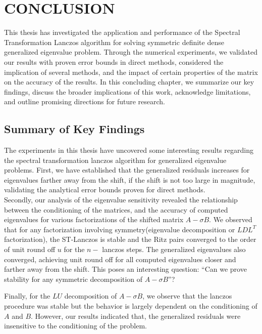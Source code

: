 \chapter{CONCLUSION}
This thesis has investigated the application and performance of the Spectral Transformation Lanczos algorithm for solving symmetric definite dense generalized eigenvalue problem. Through the numerical experiments, we validated our results with proven error bounds in direct methods, considered the implication of several methods, and the impact of certain properties of the matrix on the accuracy of the results. In this concluding chapter, we summarize our key findings, discuss the broader implications of this work, acknowledge limitations, and outline promising directions for future research.

\section{Summary of Key Findings}
The experiments in this thesis have uncovered some interesting results regarding the spectral transformation lanczos algorithm for generalized eigenvalue problems. First, we have established that the generalized residuals increases for eigenvalues farther away from the shift, if the shift is not too large in magnitude, validating the analytical error bounds proven for direct methods.\\[10pt]
Secondly, our analysis of the eigenvalue sensitivity revealed the relationship between the conditioning of the matrices, and the accuracy of computed eigenvalues for various factorizations of the shifted matrix $A-\sigma B$. We observed that for any factorization involving symmetry(eigenvalue decomposition or $LDL^T$ factorization), the ST-Lanczos is stable and the Ritz pairs converged to the order of unit round off $u$ for the $n-$ lanczos steps. The generalized eigenvalues also converged, achieving unit round off for all computed eigenvalues closer and farther away from the shift. This poses an interesting question: ``Can we prove stability for any symmetric decomposition of $A - \sigma B$''?

Finally, for the $LU$ decomposition of $A - \sigma B$, we observe that the lanczos procedure was stable but the behavior is largely dependent on the conditioning of $A$ and $B$. However, our results indicated that, the generalized residuals were insensitive to the conditioning of the problem.

